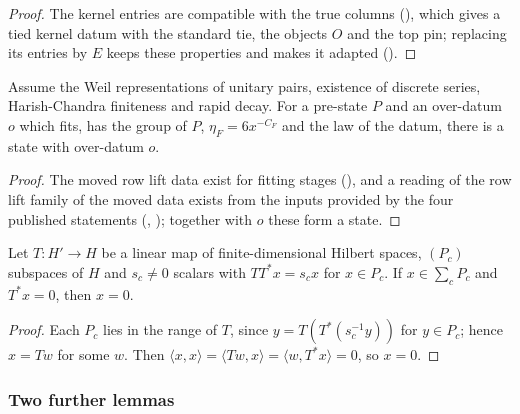\begin{proof}
The kernel entries are compatible with the true columns (), which gives a
tied kernel datum with the standard tie, the objects $O$ and the top pin; replacing its entries by $E$ keeps these properties and
makes it adapted ().
\end{proof}

\begin{lemma}\label{pf:stageU:fitstate}
Assume the Weil representations of unitary pairs, existence of discrete series, Harish-Chandra finiteness and rapid decay. For a
pre-state $P$ and an over-datum $o$ which fits, has the group of $P$, $\eta_F=6x^{-C_F}$ and the law of the datum, there is a state with
over-datum $o$.
\end{lemma}

\begin{proof}
The moved row lift data exist for fitting stages (), and a reading of
the row lift family of the moved data exists from the inputs provided by the four published statements
(, ); together
with $o$ these form a state.
\end{proof}

\begin{lemma}\label{pf:stageU:adjinj}
Let $T:H'\to H$ be a linear map of finite-dimensional Hilbert spaces, $(P_c)$ subspaces of $H$ and $s_c\ne0$ scalars with $TT^*x=s_cx$
for $x\in P_c$. If $x\in\sum_cP_c$ and $T^*x=0$, then $x=0$.
\end{lemma}

\begin{proof}
Each $P_c$ lies in the range of $T$, since $y=T(T^*(s_c^{-1}y))$ for $y\in P_c$; hence $x=Tw$ for some $w$. Then
$\langle x,x\rangle=\langle Tw,x\rangle=\langle w,T^*x\rangle=0$, so $x=0$.
\end{proof}

\subsubsection{Two further lemmas}\label{sec:pf:stageU:misc}


